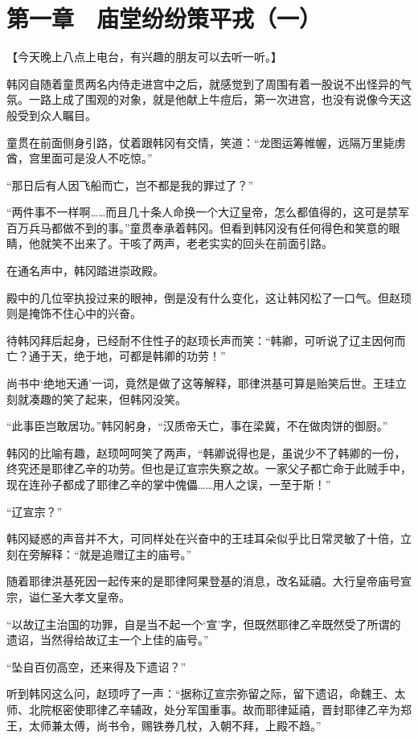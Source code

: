 \section{第一章　庙堂纷纷策平戎（一）}

【今天晚上八点上电台，有兴趣的朋友可以去听一听。】

韩冈自随着童贯两名内侍走进宫中之后，就感觉到了周围有着一股说不出怪异的气氛。一路上成了围观的对象，就是他献上牛痘后，第一次进宫，也没有说像今天这般受到众人瞩目。

童贯在前面侧身引路，仗着跟韩冈有交情，笑道：“龙图运筹帷幄，远隔万里毙虏酋，宫里面可是没人不吃惊。”

“那日后有人因飞船而亡，岂不都是我的罪过了？”

“两件事不一样啊……而且几十条人命换一个大辽皇帝，怎么都值得的，这可是禁军百万兵马都做不到的事。”童贯奉承着韩冈。但看到韩冈没有任何得色和笑意的眼睛，他就笑不出来了。干咳了两声，老老实实的回头在前面引路。

在通名声中，韩冈踏进崇政殿。

殿中的几位宰执投过来的眼神，倒是没有什么变化，这让韩冈松了一口气。但赵顼则是掩饰不住心中的兴奋。

待韩冈拜后起身，已经耐不住性子的赵顼长声而笑：“韩卿，可听说了辽主因何而亡？通于天，绝于地，可都是韩卿的功劳！”

尚书中‘绝地天通’一词，竟然是做了这等解释，耶律洪基可算是贻笑后世。王珪立刻就凑趣的笑了起来，但韩冈没笑。

“此事臣岂敢居功。”韩冈躬身，“汉质帝夭亡，事在梁冀，不在做肉饼的御厨。”

韩冈的比喻有趣，赵顼呵呵笑了两声，“韩卿说得也是，虽说少不了韩卿的一份，终究还是耶律乙辛的功劳。但也是辽宣宗失察之故。一家父子都亡命于此贼手中，现在连孙子都成了耶律乙辛的掌中傀儡……用人之误，一至于斯！”

“辽宣宗？”

韩冈疑惑的声音并不大，可同样处在兴奋中的王珪耳朵似乎比日常灵敏了十倍，立刻在旁解释：“就是追赠辽主的庙号。”

随着耶律洪基死因一起传来的是耶律阿果登基的消息，改名延禧。大行皇帝庙号宣宗，谥仁圣大孝文皇帝。

“以故辽主治国的功罪，自是当不起一个‘宣’字，但既然耶律乙辛既然受了所谓的遗诏，当然得给故辽主一个上佳的庙号。”

“坠自百仞高空，还来得及下遗诏？”

听到韩冈这么问，赵顼哼了一声：“据称辽宣宗弥留之际，留下遗诏，命魏王、太师、北院枢密使耶律乙辛辅政，处分军国重事。故而耶律延禧，晋封耶律乙辛为郑王，太师兼太傅，尚书令，赐铁券几杖，入朝不拜，上殿不趋。”

